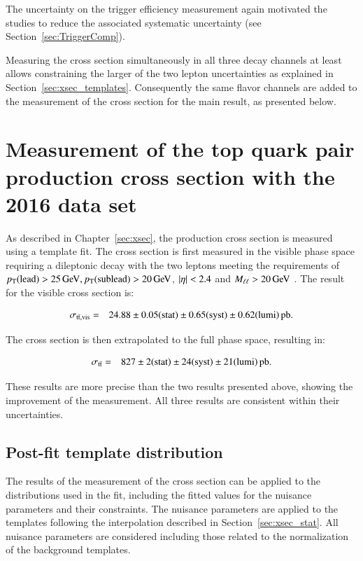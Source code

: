 The uncertainty on the trigger efficiency measurement again motivated the studies to reduce the associated systematic uncertainty (see Section~\ref{sec:TriggerComp}).

Measuring the \ttbar cross section
simultaneously in all three decay channels at least allows constraining the larger of the two lepton uncertainties as explained in Section~\ref{sec:xsec_templates}.
Consequently the same flavor channels are added to the measurement of the \ttbar cross section for the main result, as presented below. 


\section{Measurement of the top quark pair production cross section with the 2016 data set}
\label{sec:results_main}

As described in Chapter~\ref{sec:xsec}, the \ttbar production cross section is measured using a template fit.
The cross section is first measured in the visible phase space requiring a dileptonic decay with the two leptons meeting the requirements of $p_{\mathrm{T}} (\mathrm{lead}) > 25 \,\text{Ge\hspace{-.08em}V}, p_{\mathrm{T}} (\mathrm{sublead}) > 20\,\text{Ge\hspace{-.08em}V}$, $\lvert \eta \rvert < 2.4$ 
and $M_{\ell\ell} > 20 \,\text{Ge\hspace{-.08em}V}$ .
The result for the visible cross section is:

\begin{eqnarray*}
\sigma_{\mathrm{t}\bar{\mathrm{t}},\mathrm{vis}} & = & 24.88 \pm 0.05({\rm stat}) \pm 0.65 ({\rm syst}) \pm 0.62({\rm lumi})\mbox{\ensuremath{\,\text{pb}}}. 
\end{eqnarray*}

The cross section is then extrapolated to the full phase space, resulting in:

 \begin{eqnarray*}
\sigma_{\mathrm{t}\bar{\mathrm{t}}} & = & 827 \pm 2 ({\rm stat}) \pm 24 ({\rm syst}) \pm 21 ({\rm lumi}) \mbox{\ensuremath{\,\text{pb}}}.
\end{eqnarray*}

These results are more precise than the two results presented above, showing the improvement of the measurement.
All three results are consistent within their uncertainties.

\subsection{Post-fit template distribution}
\label{sec:results_templates}

The results of the measurement of the \ttbar cross section can be applied to the distributions used in the fit, including the fitted values for the
nuisance parameters and their constraints. The nuisance parameters are applied to the templates following the interpolation described in Section~\ref{sec:xsec_stat}.
All nuisance parameters are considered including those related to the normalization of the background templates.

